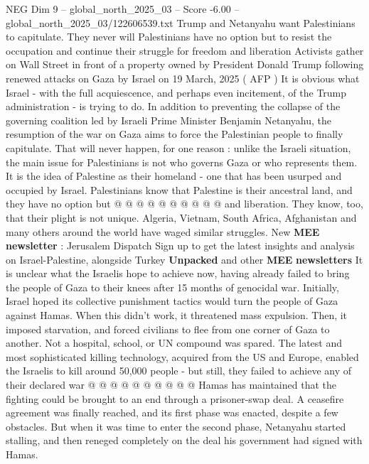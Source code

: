 \begin{textsample}{NEG Dim 9 – global\_north\_2025\_03 – Score -6.00 – global\_north\_2025\_03/122606539.txt}  \label{ex:f9_neg_070}
Trump and Netanyahu want Palestinians to capitulate.
They never will Palestinians have no option but to resist the occupation and continue their struggle for freedom and liberation Activists gather on Wall Street in front of a property owned by President Donald Trump following renewed attacks on Gaza by Israel on 19 March, 2025 ( AFP ) It is obvious what Israel - with the full acquiescence, and perhaps even incitement, of the Trump administration - is trying to do.
In addition to preventing the collapse of the governing coalition led by Israeli Prime Minister Benjamin Netanyahu, the resumption of the war on Gaza aims to force the Palestinian people to finally capitulate.
That will never happen, for one reason : unlike the Israeli situation, the main issue for Palestinians is not who governs Gaza or who represents them.
It is the idea of Palestine as their homeland - one that has been usurped and occupied by Israel.
Palestinians know that Palestine is their ancestral land, and they have no option but @ @ @ @ @ @ @ @ @ @ and liberation.
They know, too, that their plight is not unique.
Algeria, Vietnam, South Africa, Afghanistan and many others around the world have waged similar struggles.
New \textbf{MEE} \textbf{newsletter} : Jerusalem Dispatch Sign up to get the latest insights and analysis on Israel-Palestine, alongside Turkey \textbf{Unpacked} and other \textbf{MEE} \textbf{newsletters} It is unclear what the Israelis hope to achieve now, having already failed to bring the people of Gaza to their knees after 15 months of genocidal war.
Initially, Israel hoped its collective punishment tactics would turn the people of Gaza against Hamas.
When this didn't work, it threatened mass expulsion.
Then, it imposed starvation, and forced civilians to flee from one corner of Gaza to another.
Not a hospital, school, or UN compound was spared.
The latest and most sophisticated killing technology, acquired from the US and Europe, enabled the Israelis to kill around 50,000 people - but still, they failed to achieve any of their declared war @ @ @ @ @ @ @ @ @ @ Hamas has maintained that the fighting could be brought to an end through a prisoner-swap deal.
A ceasefire agreement was finally reached, and its first phase was enacted, despite a few obstacles.
But when it was time to enter the second phase, Netanyahu started stalling, and then reneged completely on the deal his government had signed with Hamas.

\end{textsample}
